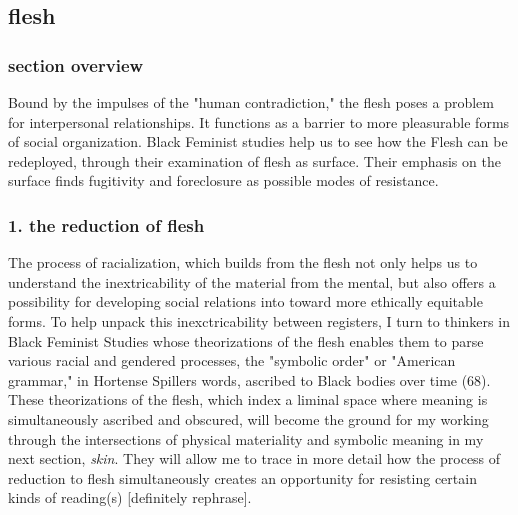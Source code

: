 \documentclass[11pt]{article}
\begin{document}
\subsection{flesh}
\label{sec:org4780f00}
\subsubsection{section overview}
\label{sec:org3529ee3}
Bound by the impulses of the "human contradiction," the flesh poses a
problem for interpersonal relationships. It functions as a barrier to
more pleasurable forms of social organization. Black Feminist studies
help us to see how the Flesh can be redeployed, through their
examination of flesh as surface. Their emphasis on the surface finds
fugitivity and foreclosure as possible modes of resistance.

\subsubsection{1. the reduction of flesh}
\label{sec:orgda3ac2d}
The process of racialization, which builds from the flesh not only
helps us to understand the inextricability of the material from the
mental, but also offers a possibility for developing social relations
into toward more ethically equitable forms. To help unpack this
inexctricability between registers, I turn to thinkers in Black
Feminist Studies whose theorizations of the flesh enables them to
parse various racial and gendered processes, the "symbolic order" or
"American grammar," in Hortense Spillers words, ascribed to Black
bodies over time (68). These theorizations of the flesh, which index a
liminal space where meaning is simultaneously ascribed and obscured,
will become the ground for my working through the intersections of
physical materiality and symbolic meaning in my next section,
\emph{skin}. They will allow me to trace in more detail how the process of
reduction to flesh simultaneously creates an opportunity for resisting
certain kinds of reading(s) [definitely rephrase].
\end{document}
